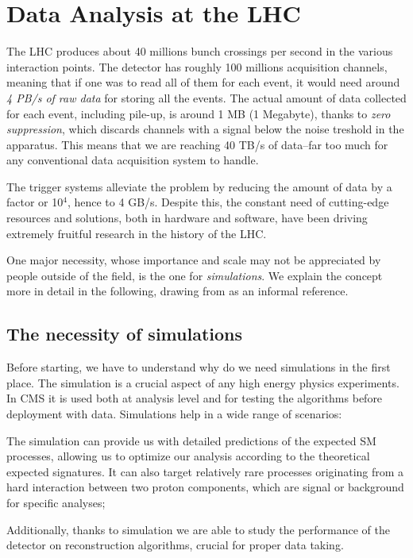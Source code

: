 \chapter{Data Analysis at the LHC}\label{ch:introduction}
The LHC produces about 40 millions bunch crossings per second in the various interaction points. The detector has roughly 100 millions acquisition channels, meaning that if one was to read all of them for each event, it would need around \emph{4 PB/s of raw data} for storing all the events. The actual amount of data collected for each event, including pile-up, is around 1 MB (1 Megabyte), thanks to \emph{zero suppression}, which discards channels with a signal below the noise treshold in the apparatus. This means that we are reaching 40 TB/s of data--far too much for any conventional data acquisition system to handle.

The trigger systems alleviate the problem by reducing the amount of data by a factor or 10$^{4}$, hence to 4 GB/s. Despite this, the constant need of cutting-edge resources and solutions, both in hardware and software, have been driving extremely fruitful research in the history of the LHC.

One major necessity, whose importance and scale may not be appreciated by people outside of the field, is the one for \emph{simulations}. We explain the concept more in detail in the following, drawing from \cite{sims} as an informal reference.

\section{The necessity of simulations}

Before starting, we have to understand why do we need simulations in the first place.
The simulation is a crucial aspect of any high energy physics experiments. In CMS it is used both
at analysis level and for testing the algorithms before deployment with data. 
Simulations help in a wide range of scenarios:

\begin{outline}
   \1  The simulation can provide us with detailed predictions of the expected SM processes, allowing us to optimize our analysis according to the theoretical expected signatures. It can also target relatively rare processes originating from a hard interaction between two proton components, which are signal or background for specific analyses;


\1 Additionally, thanks to simulation we are able to study the performance of the detector on reconstruction algorithms, crucial for proper data taking.
\end{outline}
